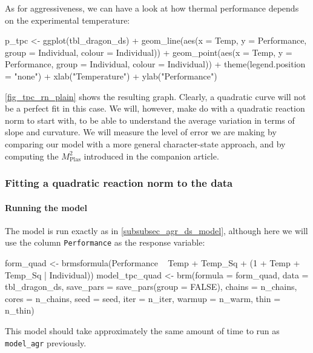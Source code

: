 \documentclass[a4paper,12pt,twoside]{article}
\begin{document}
As for aggressiveness, we can have a look at how thermal performance depends on the experimental temperature:
\begin{Rinput}
p_tpc <-
    ggplot(tbl_dragon_ds) +
    geom_line(aes(x = Temp, y = Performance, group = Individual, colour = Individual)) +
    geom_point(aes(x = Temp, y = Performance, group = Individual, colour = Individual)) +
    theme(legend.position = "none") +
    xlab("Temperature") + ylab("Performance")
\end{Rinput}
\autoref{fig_tpc_rn_plain} shows the resulting graph. Clearly, a quadratic curve will not be a perfect fit in this case. We will, however, make do with a quadratic reaction norm to start with, to be able to understand the average variation in terms of slope and curvature. We will measure the level of error we are making by comparing our model with a more general character-state approach, and by computing the $M^{2}_{\text{Plas}}$ introduced in the companion article. 

\subsubsection{Fitting a quadratic reaction norm to the data}

\paragraph{Running the model}
The model is run exactly as in \autoref{subsubsec_agr_ds_model}, although here we will use the column \texttt{Performance} as the response variable:
\begin{Rinput}
form_quad <- brmsformula(Performance ~ Temp + Temp_Sq +
                                       (1 + Temp + Temp_Sq | Individual))
model_tpc_quad <-
    brm(formula   = form_quad,
        data      = tbl_dragon_ds,
        save_pars = save_pars(group = FALSE),
        chains    = n_chains,
        cores     = n_chains,
        seed      = seed,
        iter      = n_iter,
        warmup    = n_warm,
        thin      = n_thin)
\end{Rinput}
This model should take approximately the same amount of time to run as \texttt{model\_agr} previously.
\end{document}
